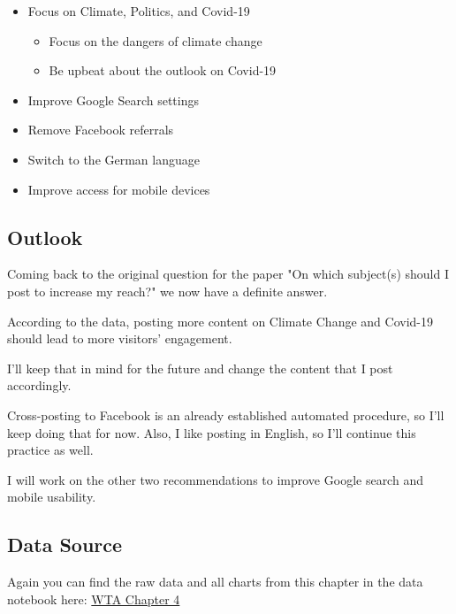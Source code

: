 \begin{itemize}
\item Focus on Climate, Politics, and Covid-19
\begin{itemize}
\item Focus on the dangers of climate change
\item Be upbeat about the outlook on Covid-19
\end{itemize}
\item Improve Google Search settings 
\item Remove Facebook referrals
\item Switch to the German language
\item Improve access for mobile devices
\end{itemize}

\subsection{Outlook}

Coming back to the original question for the paper "On which subject(s) should I post to increase my reach?" we now have a definite answer.

According to the data, posting more content on Climate Change and Covid-19 should lead to more visitors' engagement.

I'll keep that in mind for the future and change the content that I post accordingly.

Cross-posting to Facebook is an already established automated procedure, so I'll keep doing that for now. Also, I like posting in English, so I'll continue this practice as well.

I will work on the other two recommendations to improve Google search and mobile usability.

\subsection{Data Source}

Again you can find the raw data and all charts from this chapter in the data notebook here: \href{https://count.co/n/CvJzzrqBsNI}{WTA Chapter 4}
